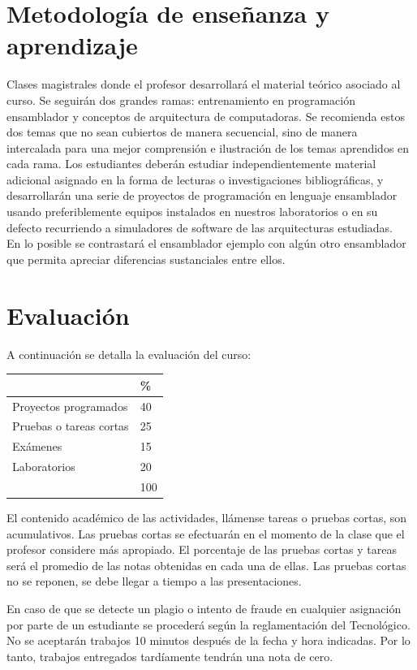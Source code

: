 \documentclass[11pt,fleqn]{report}
\begin{document}
\section{Metodología de enseñanza y
aprendizaje}\label{metodologuxeda-de-enseuxf1anza-y-aprendizaje}

Clases magistrales donde el profesor desarrollará el material teórico
asociado al curso. Se seguirán dos grandes ramas: entrenamiento en
programación ensamblador y conceptos de arquitectura de computadoras. Se
recomienda estos dos temas que no sean cubiertos de manera secuencial,
sino de manera intercalada para una mejor comprensión e ilustración de
los temas aprendidos en cada rama. Los estudiantes deberán estudiar
independientemente material adicional asignado en la forma de lecturas o
investigaciones bibliográficas, y desarrollarán una serie de proyectos
de programación en lenguaje ensamblador usando preferiblemente equipos
instalados en nuestros laboratorios o en su defecto recurriendo a
simuladores de software de las arquitecturas estudiadas.\\
En lo posible se contrastará el ensamblador ejemplo con algún otro
ensamblador que permita apreciar diferencias sustanciales entre ellos.

\section{Evaluación}\label{evaluaciuxf3n}

A continuación se detalla la evaluación del curso:

\begin{longtable}[]{@{}ll@{}}
\toprule
& \%\tabularnewline
\midrule
\endhead
Proyectos programados & 40\tabularnewline
Pruebas o tareas cortas & 25\tabularnewline
Exámenes & 15\tabularnewline
Laboratorios & 20\tabularnewline
& 100\tabularnewline
\bottomrule
\end{longtable}

El contenido académico de las actividades, llámense tareas o pruebas
cortas, son acumulativos. Las pruebas cortas se efectuarán en el momento
de la clase que el profesor considere más apropiado. El porcentaje de
las pruebas cortas y tareas será el promedio de las notas obtenidas en
cada una de ellas. Las pruebas cortas no se reponen, se debe llegar a
tiempo a las presentaciones.

En caso de que se detecte un plagio o intento de fraude en cualquier
asignación por parte de un estudiante se procederá según la
reglamentación del Tecnológico. No se aceptarán trabajos 10 minutos
después de la fecha y hora indicadas. Por lo tanto, trabajos entregados
tardíamente tendrán una nota de cero.
\end{document}
